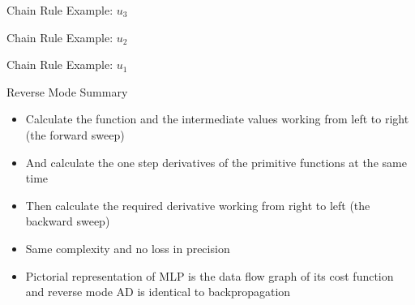 \documentclass{beamer}
\begin{document}
\begin{frame}[fragile]{Chain Rule Example: $u_3$}


\end{frame}

\begin{frame}[fragile]{Chain Rule Example: $u_2$}

\end{frame}

\begin{frame}[fragile]{Chain Rule Example: $u_1$}

\end{frame}

\begin{frame}[fragile]{Reverse Mode Summary}

\begin{itemize}
\pause
\item Calculate the function and the intermediate values working from
  left to right (the forward sweep)
\pause
\item And calculate the one step derivatives of the
  primitive functions at the same time
\pause
\item Then calculate the required derivative working from right to
  left (the backward sweep)
\pause
\item Same complexity and no loss in precision
\pause
\item Pictorial representation of MLP is the data flow graph of its cost
  function and reverse mode AD is identical to backpropagation
\end{itemize}

\end{frame}
\end{document}
